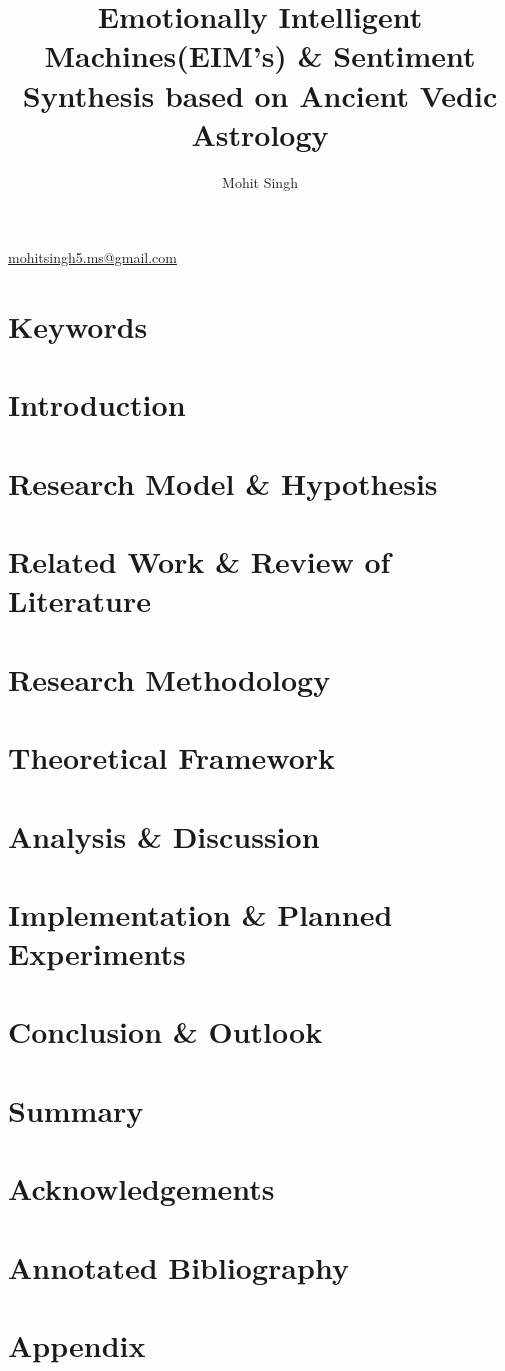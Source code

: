 \documentclass[12pt, a4paper]{article}
\title{Emotionally Intelligent Machines(EIM's) \& Sentiment Synthesis based on Ancient Vedic Astrology}
\author{Mohit Singh}
\begin{document}
	\maketitle
	\href{mailto:mohitsingh5.ms@gmail.com}{mohitsingh5.ms@gmail.com}
	\begin{abstract}
		
	\end{abstract}
	\section*{Keywords}
	\begin{multicols}{2}
		\section{Introduction}
		\section{Research Model \& Hypothesis}
		\section{Related Work \& Review of Literature}
		\section{Research Methodology}
		\section{Theoretical Framework}
		\section{Analysis \& Discussion}
		\section{Implementation \& Planned Experiments}
		\section{Conclusion \& Outlook}
	\end{multicols}
	\section*{Summary}
	\section*{Acknowledgements}
	
	
	\section*{Annotated Bibliography}
	\appendix
	\section*{Appendix}
\end{document}
